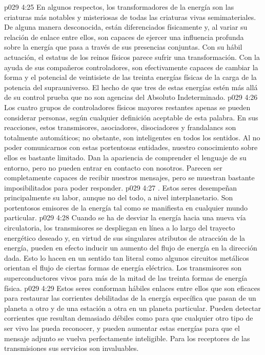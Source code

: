 \vs p029 4:25 En algunos respectos, los transformadores de la energía son las criaturas más notables y misteriosas de todas las criaturas vivas semimateriales. De alguna manera desconocida, están diferenciados físicamente y, al variar su relación de enlace entre ellos, son capaces de ejercer una influencia profunda sobre la energía que pasa a través de sus presencias conjuntas. Con su hábil actuación, el estatus de los reinos físicos parece sufrir una transformación.  Con la ayuda de sus compañeros controladores, son efectivamente capaces de cambiar la forma y el potencial de veintisiete de las treinta energías físicas de la carga de la potencia del suprauniverso. El hecho de que tres de estas energías estén más allá de su control prueba que no son agencias del Absoluto Indeterminado.
\vs p029 4:26 \pc Los cuatro grupos de controladores físicos mayores restantes apenas se pueden considerar personas, según cualquier definición aceptable de esta palabra. En sus reacciones, estos transmisores, asociadores, disociadores y frandalancs son totalmente automáticos; no obstante, son inteligentes en todos los sentidos. Al no poder comunicarnos con estas portentosas entidades, nuestro conocimiento sobre ellos es bastante limitado. Dan la apariencia de comprender el lenguaje de su entorno, pero no pueden entrar en contacto con nosotros. Parecen ser completamente capaces de recibir nuestros mensajes, pero se muestran bastante imposibilitados para poder responder.
\vs p029 4:27 . Estos seres desempeñan principalmente su labor, aunque no del todo, a nivel interplanetario. Son portentosos emisores de la energía tal como se manifiesta en cualquier mundo particular.
\vs p029 4:28 Cuando se ha de desviar la energía hacia una nueva vía circulatoria, los transmisores se despliegan en línea a lo largo del trayecto energético deseado y, en virtud de sus singulares atributos de atracción de la energía, pueden en efecto inducir un aumento del flujo de energía en la dirección dada. Esto lo hacen en un sentido tan literal como algunos circuitos metálicos orientan el flujo de ciertas formas de energía eléctrica. Los transmisores son superconductores vivos para más de la mitad de las treinta formas de energía física.
\vs p029 4:29 Estos seres conforman hábiles enlaces entre ellos que son eficaces para restaurar las corrientes debilitadas de la energía específica que pasan de un planeta a otro y de una estación a otra en un planeta particular. Pueden detectar corrientes que resultan demasiado débiles como para que cualquier otro tipo de ser vivo las pueda reconocer, y pueden aumentar estas energías para que el mensaje adjunto se vuelva perfectamente inteligible. Para los receptores de las transmisiones sus servicios son invaluables.
